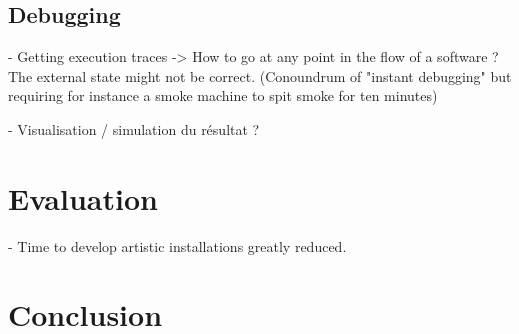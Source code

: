 \documentclass{sigchi}
\begin{document}
\subsection{Debugging}
- Getting execution traces
-> How to go at any point in the flow of a software ? The external state might not be correct.
(Conoundrum of "instant debugging" but requiring for instance a smoke machine to spit smoke for ten minutes)

- Visualisation / simulation du résultat ? 

\section{Evaluation}
- Time to develop artistic installations greatly reduced.

\section{Conclusion}
\end{document}
